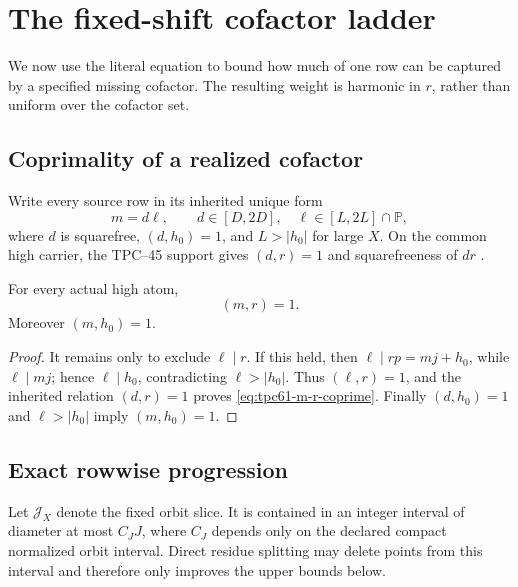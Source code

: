 \section{The fixed-shift cofactor ladder}
\label{sec:tpc61-cofactor-ladder}

We now use the literal equation to bound how much of one row can be
captured by a specified missing cofactor.  The resulting weight is harmonic
in \(r\), rather than uniform over the cofactor set.

\subsection{Coprimality of a realized cofactor}

Write every source row in its inherited unique form
\begin{equation}
 m=d\ell,
 \qquad d\in[D,2D],\quad \ell\in[L,2L]\cap\mathbb P,
 \label{eq:tpc61-row-factorization}
\end{equation}
where \(d\) is squarefree, \((d,h_0)=1\), and \(L>|h_0|\) for large
\(X\).  On the common high carrier, the TPC--45 support gives
\((d,r)=1\) and squarefreeness of \(dr\)
\citep{WangTPC45,WangTPC59,WangTPC60}.

\begin{lemma}
\label{lem:tpc61-full-row-cofactor-coprimality}
For every actual high atom,
\begin{equation}
 \boxed{(m,r)=1.}
 \label{eq:tpc61-m-r-coprime}
\end{equation}
Moreover \((m,h_0)=1\).
\end{lemma}

\begin{proof}
It remains only to exclude \(\ell\mid r\).  If this held, then
\(\ell\mid rp=mj+h_0\), while \(\ell\mid mj\); hence
\(\ell\mid h_0\), contradicting \(\ell>|h_0|\).  Thus
\((\ell,r)=1\), and the inherited relation \((d,r)=1\) proves
\eqref{eq:tpc61-m-r-coprime}.  Finally \((d,h_0)=1\) and
\(\ell>|h_0|\) imply \((m,h_0)=1\).
\end{proof}

\subsection{Exact rowwise progression}

Let \(\mathcal J_X\) denote the fixed orbit slice.  It is contained in an
integer interval of diameter at most \(C_JJ\), where \(C_J\) depends only
on the declared compact normalized orbit interval.  Direct residue
splitting may delete points from this interval and therefore only improves
the upper bounds below.

